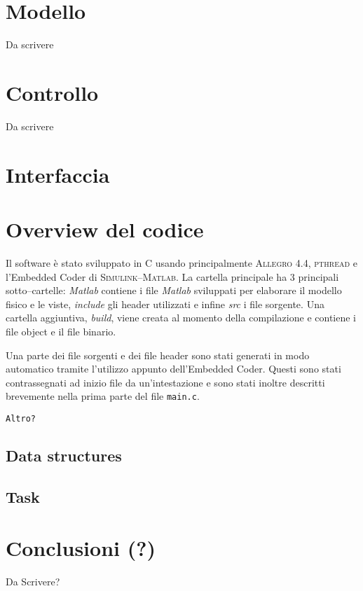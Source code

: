 \section{Modello}
\label{sez:modello}
Da scrivere

\section{Controllo}
\label{sez:controllo}
Da scrivere

\section{Interfaccia}



\section{Overview del codice}

Il software \`e stato sviluppato in C usando principalmente \textsc{Allegro} 4.4, \textsc{pthread} e l'Embedded Coder di \textsc{Simulink--Matlab}. La cartella principale ha 3 principali sotto--cartelle: \textit{Matlab} contiene i file \textit{Matlab} sviluppati per elaborare il modello fisico e le viste, \textit{include} gli header utilizzati e infine \textit{src} i file sorgente. Una cartella aggiuntiva, \textit{build}, viene creata al momento della compilazione e contiene i file object e il file binario.

Una parte dei file sorgenti e dei file header sono stati generati in modo automatico tramite l'utilizzo appunto dell'Embedded Coder. Questi sono stati contrassegnati ad inizio file da un'intestazione e sono stati inoltre descritti brevemente nella prima parte del file \texttt{main.c}.

\texttt{Altro?}

\subsection{Data structures}


\subsection{Task}

\FloatBarrier

\section{Conclusioni (?)}
Da Scrivere?

	
